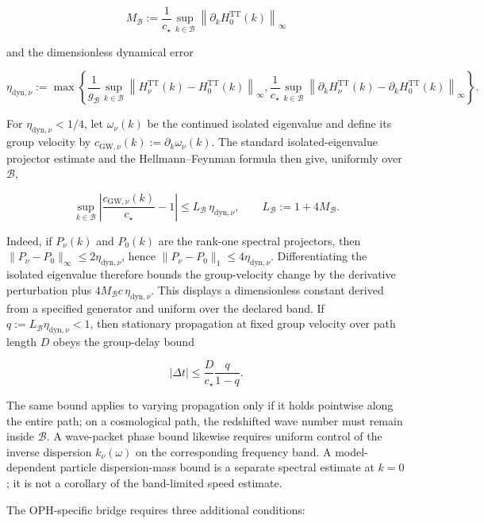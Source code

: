 \[
M_{\mathcal B}
:=\frac{1}{c_\star}\sup_{k\in\mathcal B}
\left\|\partial_k H_0^{\mathrm{TT}}(k)\right\|_\infty
\]

and the dimensionless dynamical error

\[
\eta_{\mathrm{dyn},\nu}
:=\max\!\left\{
\frac{1}{g_{\mathcal B}}\sup_{k\in\mathcal B}
\left\|H_\nu^{\mathrm{TT}}(k)-H_0^{\mathrm{TT}}(k)\right\|_\infty,
\frac{1}{c_\star}\sup_{k\in\mathcal B}
\left\|\partial_k H_\nu^{\mathrm{TT}}(k)-\partial_k H_0^{\mathrm{TT}}(k)\right\|_\infty
\right\}.
\]

For \(\eta_{\mathrm{dyn},\nu}<1/4\), let \(\omega_\nu(k)\) be the continued isolated eigenvalue and define its group velocity by \(c_{\mathrm{GW},\nu}(k):=\partial_k\omega_\nu(k)\). The standard isolated-eigenvalue projector estimate and the Hellmann--Feynman formula then give, uniformly over \(\mathcal B\),

\[
\sup_{k\in\mathcal B}
\left|\frac{c_{\mathrm{GW},\nu}(k)}{c_\star}-1\right|
\le L_{\mathcal B}\,\eta_{\mathrm{dyn},\nu},
\qquad
L_{\mathcal B}:=1+4M_{\mathcal B}.
\]

Indeed, if \(P_\nu(k)\) and \(P_0(k)\) are the rank-one spectral projectors, then \(\|P_\nu-P_0\|_\infty\le2\eta_{\mathrm{dyn},\nu}\), hence \(\|P_\nu-P_0\|_1\le4\eta_{\mathrm{dyn},\nu}\). Differentiating the isolated eigenvalue therefore bounds the group-velocity change by the derivative perturbation plus \(4M_{\mathcal B}c\,\eta_{\mathrm{dyn},\nu}\). This displays a dimensionless constant derived from a specified generator and uniform over the declared band. If \(q:=L_{\mathcal B}\eta_{\mathrm{dyn},\nu}<1\), then stationary propagation at fixed group velocity over path length \(D\) obeys the group-delay bound

\[
|\Delta t|\le \frac{D}{c_\star}\frac{q}{1-q}.
\]

The same bound applies to varying propagation only if it holds pointwise along the entire path; on a cosmological path, the redshifted wave number must remain inside \(\mathcal B\). A wave-packet phase bound likewise requires uniform control of the inverse dispersion \(k_\nu(\omega)\) on the corresponding frequency band. A model-dependent particle dispersion-mass bound is a separate spectral estimate at \(k=0\); it is not a corollary of the band-limited speed estimate.

The OPH-specific bridge requires three additional conditions:


